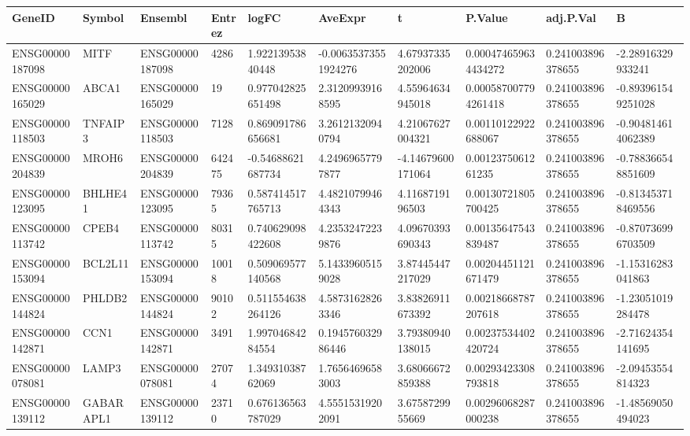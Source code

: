 \begingroup
\tiny
\setlength{\tabcolsep}{2pt}
\renewcommand{\arraystretch}{1.18}
\begin{tabular}{@{}llllllllll@{}}
\toprule
GeneID & Symbol & Ensembl & Entrez & logFC & AveExpr & t & P.Value & adj.P.Val & B \\
\midrule
ENSG00000187098 & MITF & ENSG00000187098 & 4286 & 1.92213953840448 & -0.00635373551924276 & 4.67937335202006 & 0.000474659634434272 & 0.241003896378655 & -2.28916329933241 \\
ENSG00000165029 & ABCA1 & ENSG00000165029 & 19 & 0.977042825651498 & 2.31209939168595 & 4.55964634945018 & 0.000587007794261418 & 0.241003896378655 & -0.893961549251028 \\
ENSG00000118503 & TNFAIP3 & ENSG00000118503 & 7128 & 0.869091786656681 & 3.26121320940794 & 4.21067627004321 & 0.00110122922688067 & 0.241003896378655 & -0.904814614062389 \\
ENSG00000204839 & MROH6 & ENSG00000204839 & 642475 & -0.54688621687734 & 4.24969657797877 & -4.14679600171064 & 0.0012375061261235 & 0.241003896378655 & -0.788366548851609 \\
ENSG00000123095 & BHLHE41 & ENSG00000123095 & 79365 & 0.587414517765713 & 4.48210799464343 & 4.1168719196503 & 0.00130721805700425 & 0.241003896378655 & -0.813453718469556 \\
ENSG00000113742 & CPEB4 & ENSG00000113742 & 80315 & 0.740629098422608 & 4.23532472239876 & 4.09670393690343 & 0.00135647543839487 & 0.241003896378655 & -0.870736996703509 \\
ENSG00000153094 & BCL2L11 & ENSG00000153094 & 10018 & 0.509069577140568 & 5.14339605159028 & 3.87445447217029 & 0.00204451121671479 & 0.241003896378655 & -1.15316283041863 \\
ENSG00000144824 & PHLDB2 & ENSG00000144824 & 90102 & 0.511554638264126 & 4.58731628263346 & 3.83826911673392 & 0.00218668787207618 & 0.241003896378655 & -1.23051019284478 \\
ENSG00000142871 & CCN1 & ENSG00000142871 & 3491 & 1.99704684284554 & 0.194576032986446 & 3.79380940138015 & 0.00237534402420724 & 0.241003896378655 & -2.71624354141695 \\
ENSG00000078081 & LAMP3 & ENSG00000078081 & 27074 & 1.34931038762069 & 1.76564696583003 & 3.68066672859388 & 0.00293423308793818 & 0.241003896378655 & -2.09453554814323 \\
ENSG00000139112 & GABARAPL1 & ENSG00000139112 & 23710 & 0.676136563787029 & 4.55515319202091 & 3.6758729955669 & 0.00296068287000238 & 0.241003896378655 & -1.48569050494023 \\

\end{tabular}
